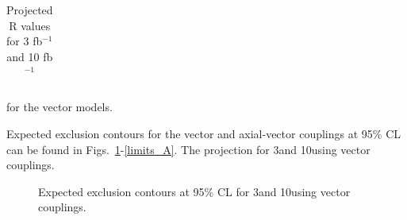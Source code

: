 \begin{table}[h]
\begin{tabular}{llll}
\end{tabular}
\caption{Projected R values for 3 fb$^{-1}$ and 10 fb$^{-1}$} for the vector models.
\label{tab:dm_V_R_values}
\end{table}


Expected exclusion contours for the vector and axial-vector couplings at 95\% CL can be found in Figs.~\ref{fig:limits_V}-\ref{limits_A}. The projection for  3\fbinv and 10\fbinv using vector couplings.

\begin{figure}[h]
  \centering
  \caption{\label{fig:limits_V} Expected exclusion contours at 95\% CL for 3\fbinv and 10\fbinv using vector couplings. }
\end{figure}


